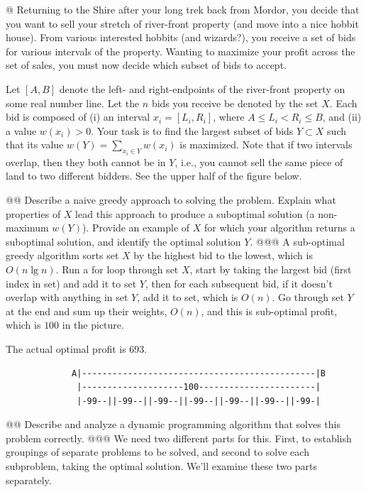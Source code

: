 \documentclass[10pt]{article}\usepackage[]{graphicx}\usepackage[]{xcolor}
\begin{document}
\begin{easylist}[enumerate]
    @ Returning to the Shire after your long trek back from Mordor, you decide that you want to sell your stretch of
    river-front property (and move into a nice hobbit house). From various interested hobbits (and wizards?), you
    receive a set of bids for various intervals of the property. Wanting to maximize your profit across the set of
    sales, you must now decide which subset of bids to accept.\newline

    Let $[A, B]$ denote the left- and right-endpoints of the river-front property on some real number line. Let the $n$
    bids you receive be denoted by the set $X$. Each bid is composed of (i) an interval $x_i = [ L_i , R_i ]$, where $A
    \le L_i < R_i \le B$, and (ii) a value $w(x_i) > 0$. Your task is to find the largest subset of bids $Y \subset X$
    such that its value $w(Y) = \sum_{x_i \in Y} w(x_i)$ is maximized. Note that if two intervals overlap, then they
    both cannot be in $Y$, i.e., you cannot sell the same piece of land to two different bidders.  See the upper half of
    the figure below.

    @@ Describe a naive greedy approach to solving the problem. Explain what properties of $X$ lead this approach to
    produce a suboptimal solution (a non-maximum $w(Y)$). Provide an example of $X$ for which your algorithm returns a
    suboptimal solution, and identify the optimal solution $Y$.
    @@@ A sub-optimal greedy algorithm sorts set $X$ by the highest bid to the lowest, which is $O(n \lg n)$.  Run a
    {\ttfamily for loop} through set $X$, start by taking the largest bid (first index in set) and add it to set $Y$,
    then for each subsequent bid, if it doesn't overlap with anything in set $Y$, add it to set, which is $O(n)$.  Go
    through set $Y$ at the end and sum up their weights, $O(n)$, and this is sub-optimal profit, which is $100$ in the
    picture.\newline

    The actual optimal profit is 693.

    \begin{verbatim}
             A|----------------------------------------------|B
              |--------------------100-----------------------|
              |-99--||-99--||-99--||-99--||-99--||-99--||-99-|
    \end{verbatim}

    @@ Describe and analyze a dynamic programming algorithm that solves this problem correctly.
    @@@ We need two different parts for this. First, to establish groupings of separate problems to be solved, and
    second to solve each subproblem, taking the optimal solution. We'll examine these two parts separately.\newline


\end{easylist}
\end{document}
